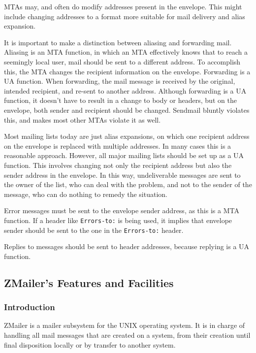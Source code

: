 MTAs may, and often do modify addresses present in the envelope. This might 
include changing addresses to a format more suitable for mail delivery and 
alias expansion.

It is important to make a distinction between aliasing and forwarding mail. 
Aliasing is an MTA function, in which an MTA effectively knows that to reach 
a seemingly local user, mail should be sent to a different address. 
To accomplish this, the MTA changes the recipient information on the envelope. 
Forwarding is a UA function. When forwarding, the mail message is received 
by the original, intended recipient, and re-sent to another address. Although 
forwarding is a UA function, it doesn't have to result in a change to body or 
headers, but on the envelope, both sender and recipient should be changed. 
Sendmail bluntly violates this, and makes most other MTAs violate it as well.

Most mailing lists today are just alias expansions, on which one recipient 
address on the envelope is replaced with multiple addresses. In many cases 
this is a reasonable approach. However, all major mailing lists should be 
set up as a UA function. This involves changing not only the recipient 
address but also the sender address in the envelope. In this way, 
undeliverable messages are sent to the owner of the list, who can deal 
with the problem, and not to the sender of the message, who can do nothing 
to remedy the situation.

Error messages must be sent to the envelope sender address, as this is a 
MTA function. If a header like {\tt Errors-to:} is being used, it implies 
that envelope sender should be sent to the one in the {\tt Errors-to:} header.

Replies to messages should be sent to header addresses, because replying is 
a UA function.




\subsection{ZMailer's Features and Facilities}




\subsubsection{Introduction}

ZMailer is a mailer subsystem for the UNIX operating system.
It is in charge of handling all mail messages that are created
on a system, from their creation until final disposition locally
or by transfer to another system.

